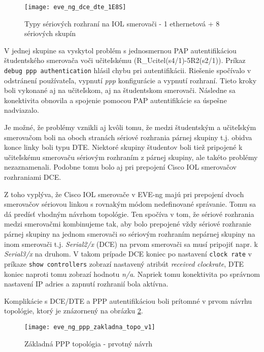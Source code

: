 \begin{figure}
    \centering
    \texttt{[image: eve\_ng\_dce\_dte\_1E8S]}
    \caption{Typy sériových rozhraní na IOL smerovači - 1 ethernetová + 8 sériových skupín}
    \label{obr:eve_ng_dce_dte_1E8S}
\end{figure}

V jednej skupine sa vyskytol problém s jednosmernou PAP autentifikáciou študentského smerovača voči učiteľskému (R\_Ucitel(s4/1)-5R2(s2/1)). Príkaz \texttt{debug ppp authentication} hlásil chybu pri autentifikácii. Riešenie spočívalo v odstránení používateľa, vypnutí \emph{ppp} konfigurácie a vypnutí rozhraní. Tieto kroky boli vykonané aj na učiteľskom, aj na študentskom smerovači. Následne sa konektivita obnovila a spojenie pomocou PAP autentifikácie sa úspešne nadviazalo.

Je možné, že problémy vznikli aj kvôli tomu, že medzi študentským a učiteľským smerovačom boli na oboch stranách sériové rozhrania párnej skupiny t.j. obidva konce linky boli typu DTE. Niektoré skupiny študentov boli tiež pripojené k učiteľskému smerovaču sériovým rozhraním z párnej skupiny, ale takéto problémy nezaznamenali. Podobne tomu bolo aj pri prepojení Cisco IOL smerovačov rozhraniami DCE.

Z toho vyplýva, že Cisco IOL smerovače v EVE-ng majú pri prepojení dvoch smerovačov sériovou linkou s rovnakým módom nedefinované správanie. Tomu sa dá predísť vhodným návrhom topológie. Ten spočíva v tom, že sériové rozhrania medzi smerovačmi kombinujeme tak, aby bolo prepojené vždy sériové rozhranie párnej skupiny na jednom smerovači so sériovým rozhraním nepárnej skupiny na inom smerovači t.j. \emph{Serial2/x} (DCE) na prvom smerovači sa musí pripojiť napr. k \emph{Serial3/x} na druhom. V takom prípade DCE koniec po nastavení \texttt{clock rate} v príkaze \texttt{show controllers} zobrazí nastavený atribút \emph{received clockrate}, DTE koniec naproti tomu zobrazí hodnotu \emph{n/a}. Napriek tomu konektivita po správnom nastavení IP adries a zapnutí rozhranií bola aktívna.

Komplikácie s DCE/DTE a PPP autentifikáciou boli prítomné v prvom návrhu topológie, ktorý je znázornený na obrázku \ref{obr:eve_ng_ppp_zakladna_topo_v1}.

\begin{figure}
    \centering
    \texttt{[image: eve\_ng\_ppp\_zakladna\_topo\_v1]}
    \caption{Základná PPP topológia - prvotný návrh}
    \label{obr:eve_ng_ppp_zakladna_topo_v1}
\end{figure}

